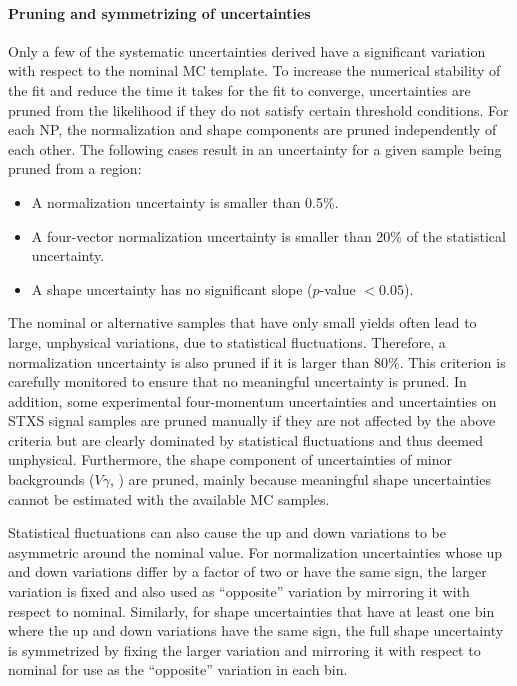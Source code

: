\paragraph{Pruning and symmetrizing of uncertainties}
Only a few of the systematic uncertainties derived have a significant variation with respect to the nominal MC template. To increase the numerical stability of the fit and reduce the time it takes for the fit to converge, uncertainties are pruned from the likelihood if they do not satisfy certain threshold conditions.
For each NP, the normalization and shape components are pruned independently of each other.
The following cases result in an uncertainty for a given sample being pruned from a region:
\begin{itemize}
    \item A normalization uncertainty is smaller than 0.5\%.
    \item A four-vector normalization uncertainty is smaller than 20\% of the statistical uncertainty. 
    \item A shape uncertainty has no significant slope ($p$-value $< 0.05$).
\end{itemize}
The nominal or alternative samples that have only small yields often lead to large, unphysical variations, due to statistical fluctuations. 
Therefore, a normalization uncertainty is also pruned if it is larger than 80\%. 
This criterion is carefully monitored to ensure that no meaningful uncertainty is pruned.
In addition, some experimental four-momentum uncertainties and uncertainties on STXS signal samples are pruned manually if they are not affected by the above criteria but are clearly dominated by statistical fluctuations and thus deemed unphysical.
Furthermore, the shape component of uncertainties of minor backgrounds ($V\gamma$, \Zgamma) are pruned, mainly because meaningful shape uncertainties cannot be estimated with the available MC samples. 

Statistical fluctuations can also cause the up and down variations to be asymmetric around the nominal value. 
For normalization uncertainties whose up and down variations differ by a factor of two or have the same sign, the larger variation is fixed and also used as ``opposite'' variation by mirroring it with respect to nominal.
Similarly, for shape uncertainties that have at least one bin where the up and down variations have the same sign, the full shape uncertainty is symmetrized by fixing the larger variation and mirroring it with respect to nominal for use as the ``opposite'' variation in each bin.

